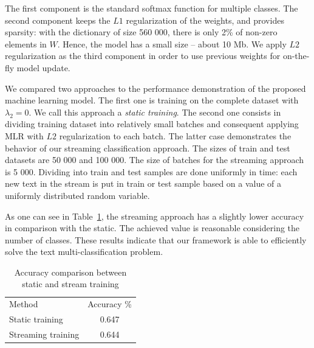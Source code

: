 The first component is the standard softmax function for multiple classes. The second component keeps the $L1$ regularization of the weights, and provides sparsity: with the dictionary of size 560 000, there is only 2\% of non-zero elements in $W$. Hence, the model has a small size -- about 10 Mb. We apply $L2$ regularization as the third component in order to use previous weights for on-the-fly model update.

We compared two approaches to the performance demonstration of the proposed machine learning model. The first one is training on the complete dataset with $\lambda_2 = 0$. We call this approach a {\em static training}. The second one consists in dividing training dataset into relatively small batches and consequent applying MLR with $L2$ regularization to each batch. The latter case demonstrates the behavior of our streaming classification approach. The sizes of train and test datasets are 50 000 and 100 000. The size of batches for the streaming approach is 5 000. Dividing into train and test samples are done uniformly in time: each new text in the stream is put in train or test sample based on a value of a uniformly distributed random variable.

As one can see in Table~\ref{accuracy}, the streaming approach has a slightly lower accuracy in comparison with the static. The achieved value is reasonable considering the number of classes. These results indicate that our framework is able to efficiently solve the text multi-classification problem.

\begin{table}[htbp]
\begin{tabular}{lc}
Method             & Accuracy \% \\
Static training    & 0.647       \\
Streaming training & 0.644         
\end{tabular}
\caption{Accuracy comparison between static and stream training}
\label{accuracy}
\vspace{-7mm}
\end{table}